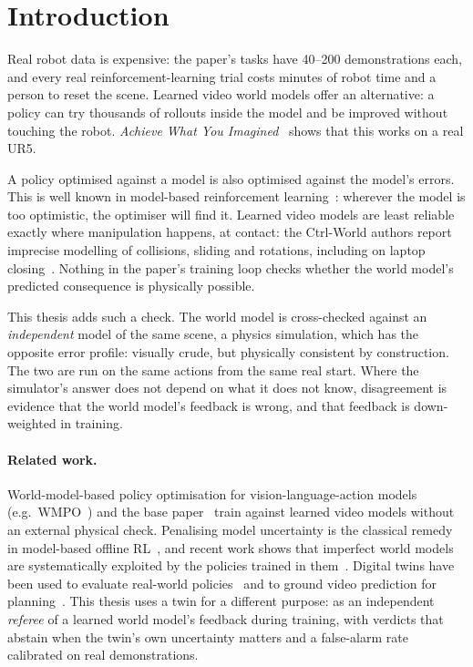 \documentclass[11pt,a4paper]{article}
\theoremstyle{plain}
\theoremstyle{definition}
\theoremstyle{remark}
\begin{document}
\tableofcontents

\section{Introduction}
Real robot data is expensive: the paper's tasks have 40--200 demonstrations each, and every real reinforcement-learning trial costs minutes of robot time and a person to reset the scene. Learned video world models offer an alternative: a policy can try thousands of rollouts inside the model and be improved without touching the robot. \emph{Achieve What You Imagined}~\cite{a2a} shows that this works on a real UR5.

A policy optimised against a model is also optimised against the model's errors. This is well known in model-based reinforcement learning~\cite{mopo,exploitable}: wherever the model is too optimistic, the optimiser will find it. Learned video models are least reliable exactly where manipulation happens, at contact: the Ctrl-World authors report imprecise modelling of collisions, sliding and rotations, including on laptop closing~\cite{ctrlworld}. Nothing in the paper's training loop checks whether the world model's predicted consequence is physically possible.

This thesis adds such a check. The world model is cross-checked against an \emph{independent} model of the same scene, a physics simulation, which has the opposite error profile: visually crude, but physically consistent by construction. The two are run on the same actions from the same real start. Where the simulator's answer does not depend on what it does not know, disagreement is evidence that the world model's feedback is wrong, and that feedback is down-weighted in training.

\paragraph{Related work.} World-model-based policy optimisation for vision-language-action models (e.g.\ WMPO~\cite{wmpo}) and the base paper~\cite{a2a} train against learned video models without an external physical check. Penalising model uncertainty is the classical remedy in model-based offline RL~\cite{mopo}, and recent work shows that imperfect world models are systematically exploited by the policies trained in them~\cite{exploitable}. Digital twins have been used to evaluate real-world policies~\cite{realissim} and to ground video prediction for planning~\cite{vptwin}. This thesis uses a twin for a different purpose: as an independent \emph{referee} of a learned world model's feedback during training, with verdicts that abstain when the twin's own uncertainty matters and a false-alarm rate calibrated on real demonstrations.
\end{document}
